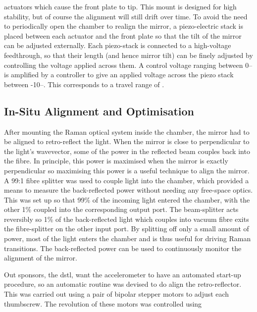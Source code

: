 actuators which cause the front plate to tip. This mount
is designed for high stability, but of course the alignment will still drift
over time. To avoid the need to periodically open the chamber to realign the
mirror, a piezo-electric stack is placed between each actuator and the front
plate so that the tilt of the mirror can be adjusted externally. Each
piezo-stack is connected to a high-voltage feedthrough, so that their length
(and hence mirror tilt) can be finely adjusted by controlling the voltage
applied across them. A control voltage ranging between 0-- is
amplified by a controller to give an applied voltage across the piezo stack
between -10--. This corresponds to a travel range of
.
\subsection{In-Situ Alignment and Optimisation}\label{sec:in_situ} 
After mounting the Raman optical system inside the chamber, the
mirror had to be aligned to retro-reflect the light. When the mirror is close to
perpendicular to the light's wavevector, some of the power in the reflected beam
couples back into the fibre. In principle, this power is maximised when the
mirror is exactly perpendicular so maximising this power is a useful technique
to align the mirror. A 99:1 fibre splitter was used to couple light into the
chamber, which provided a means to measure the back-reflected power without
needing any free-space optics. This was set up so that 99\% of the incoming
light entered the chamber, with the other 1\% coupled into the corresponding
output port. The beam-splitter acts reversibly so 1\% of the
back-reflected light which couples into vacuum fibre exits the fibre-splitter on
the other input port.  
By splitting off only a small amount of
power, most of the light enters the chamber and is thus useful for
driving Raman transitions. The back-reflected power can be used to 
continuously monitor the alignment of the mirror.
\par\noindent 
Out sponsors, the dstl, want the accelerometer to have an automated
start-up procedure, so an automatic routine was devised to do align
the retro-reflector. This was carried out using
a pair of bipolar stepper motors to adjust each thumbscrew. The revolution of these motors was controlled using
